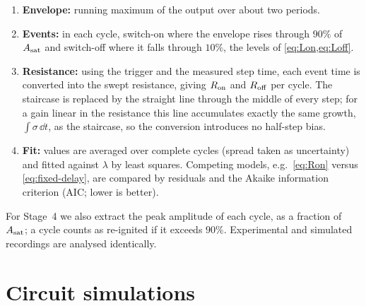 \begin{enumerate}[label=\arabic*.]
  \item \textbf{Envelope:} running maximum of the output over about two periods.
  \item \textbf{Events:} in each cycle, switch-on where the envelope rises through $90\%$ of $A_{\mathrm{sat}}$ and
        switch-off where it falls through $10\%$, the levels of \cref{eq:Lon,eq:Loff}.
  \item \textbf{Resistance:} using the trigger and the measured step time, each event time is converted
        into the swept resistance, giving $R_{\mathrm{on}}$ and $R_{\mathrm{off}}$ per cycle. The staircase is replaced by the
        straight line through the middle of every step; for a gain linear in the resistance this line
        accumulates exactly the same growth, $\int\sigma\,\dd t$, as the staircase, so the conversion
        introduces no half-step bias.
  \item \textbf{Fit:} values are averaged over complete cycles (spread taken as uncertainty) and fitted
        against $\lambda$ by least squares. Competing models, e.g.\ \cref{eq:Ron} versus
        \cref{eq:fixed-delay}, are compared by residuals and the Akaike information criterion (AIC; lower
        is better).
\end{enumerate}
For Stage~4 we also extract the peak amplitude of each cycle, as a fraction of $A_{\mathrm{sat}}$; a cycle counts as
re-ignited if it exceeds $90\%$. Experimental and simulated recordings are analysed identically.

\section{Circuit simulations}\label{sec:simulation}

